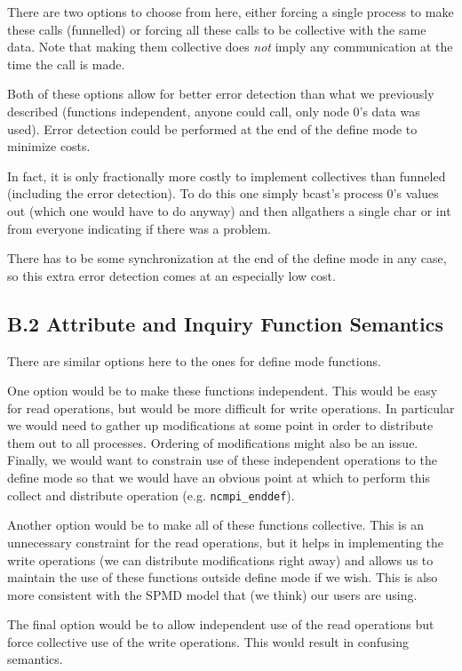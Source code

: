 \documentclass[10pt]{article}
\begin{document}
There are two options to choose from here, either forcing a single process to
make these calls (funnelled) or forcing all these calls to be collective with
the same data.  Note that making them collective does \emph{not} imply any
communication at the time the call is made.

Both of these options allow for better error detection than what we
previously described (functions independent, anyone could call, only node
0's data was used).  Error detection could be performed at the end of the
define mode to minimize costs.

In fact, it is only fractionally more costly to implement collectives than
funneled (including the error detection).  To do this one simply bcast's
process 0's values out (which one would have to do anyway) and then
allgathers a single char or int from everyone indicating if there was a
problem.

There has to be some synchronization at the end of the define mode in any
case, so this extra error detection comes at an especially low cost.

\subsection*{B.2  Attribute and Inquiry Function Semantics}

There are similar options here to the ones for define mode functions.

One option would be to make these functions independent.  This would be easy
for read operations, but would be more difficult for write operations.  In
particular we would need to gather up modifications at some point in order to
distribute them out to all processes.  Ordering of modifications might also be
an issue.  Finally, we would want to constrain use of these independent
operations to the define mode so that we would have an obvious point at which
to perform this collect and distribute operation (e.g. \texttt{ncmpi\_enddef}).

Another option would be to make all of these functions collective.  This is an
unnecessary constraint for the read operations, but it helps in implementing
the write operations (we can distribute modifications right away) and allows
us to maintain the use of these functions outside define mode if we wish.
This is also more consistent with the SPMD model that (we think) our users are
using.

The final option would be to allow independent use of the read operations but
force collective use of the write operations.  This would result in confusing
semantics.
\end{document}
